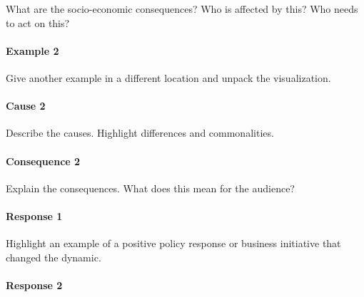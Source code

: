 \documentclass[
]{krantz}
\renewenvironment{quote}{\begin{VF}}{\end{VF}}
\begin{document}
\begin{quote}
What are the socio-economic consequences? Who is affected by this? Who needs to act on this?
\end{quote}

\hypertarget{example-2}{%
\paragraph*{Example 2}\label{example-2}}

\begin{quote}
Give another example in a different location and unpack the visualization.
\end{quote}

\hypertarget{cause-2}{%
\paragraph*{Cause 2}\label{cause-2}}

\begin{quote}
Describe the causes. Highlight differences and commonalities.
\end{quote}

\hypertarget{consequence-2}{%
\paragraph*{Consequence 2}\label{consequence-2}}

\begin{quote}
Explain the consequences. What does this mean for the audience?
\end{quote}

\hypertarget{response-1}{%
\paragraph*{Response 1}\label{response-1}}

\begin{quote}
Highlight an example of a positive policy response or business initiative that changed the dynamic.
\end{quote}

\hypertarget{response-2}{%
\paragraph*{Response 2}\label{response-2}}
\end{document}
